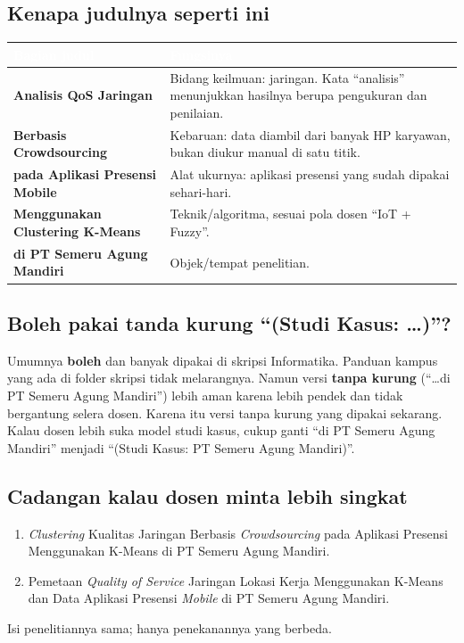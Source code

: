 \documentclass[11pt,a4paper]{article}
\newcommand{\term}[1]{\cellcolor{band}\textbf{#1}}
\newcommand{\kepala}[2]{\rowcolor{head}\textcolor{white}{\textbf{#1}} & \textcolor{white}{\textbf{#2}}\\ \midrule}
\begin{document}
\subsection{Kenapa judulnya seperti ini}
\begin{longtable}{KV}
\toprule
\kepala{Bagian judul}{Fungsinya}
\endhead
\term{Analisis QoS Jaringan} & Bidang keilmuan: jaringan. Kata ``analisis'' menunjukkan hasilnya berupa pengukuran dan penilaian. \\
\term{Berbasis Crowdsourcing} & Kebaruan: data diambil dari banyak HP karyawan, bukan diukur manual di satu titik. \\
\term{pada Aplikasi Presensi Mobile} & Alat ukurnya: aplikasi presensi yang sudah dipakai sehari-hari. \\
\term{Menggunakan Clustering K-Means} & Teknik/algoritma, sesuai pola dosen ``IoT + Fuzzy''. \\
\term{di PT Semeru Agung Mandiri} & Objek/tempat penelitian. \\
\bottomrule
\end{longtable}

\subsection{Boleh pakai tanda kurung ``(Studi Kasus: \ldots)''?}
Umumnya \textbf{boleh} dan banyak dipakai di skripsi Informatika. Panduan kampus yang ada di folder skripsi tidak melarangnya. Namun versi \textbf{tanpa kurung} (``\ldots di PT Semeru Agung Mandiri'') lebih aman karena lebih pendek dan tidak bergantung selera dosen. Karena itu versi tanpa kurung yang dipakai sekarang. Kalau dosen lebih suka model studi kasus, cukup ganti ``di PT Semeru Agung Mandiri'' menjadi ``(Studi Kasus: PT Semeru Agung Mandiri)''.

\subsection{Cadangan kalau dosen minta lebih singkat}
\begin{enumerate}
\item \textit{Clustering} Kualitas Jaringan Berbasis \textit{Crowdsourcing} pada Aplikasi Presensi Menggunakan K-Means di PT Semeru Agung Mandiri.
\item Pemetaan \textit{Quality of Service} Jaringan Lokasi Kerja Menggunakan K-Means dan Data Aplikasi Presensi \textit{Mobile} di PT Semeru Agung Mandiri.
\end{enumerate}
Isi penelitiannya sama; hanya penekanannya yang berbeda.
\end{document}

